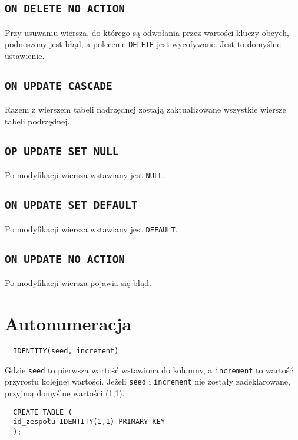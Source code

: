 \documentclass[a4paper]{article}
\begin{document}
\subsection{\tt ON DELETE NO ACTION}

Przy usuwaniu wiersza, do którego są odwołania przez wartości kluczy obcych, podnoszony jest błąd, a polecenie \texttt{DELETE} jest wycofywane. Jest to domyślne ustawienie.

\subsection{\tt ON UPDATE CASCADE}

Razem z wierszem tabeli nadrzędnej zostają zaktualizowane wszystkie wiersze tabeli podrzędnej.

\subsection{\tt OP UPDATE SET NULL}

Po modyfikacji wiersza wstawiany jest \texttt{NULL}.

\subsection{\tt ON UPDATE SET DEFAULT}

Po modyfikacji wiersza wstawiany jest \texttt{DEFAULT}.

\subsection{\tt ON UPDATE NO ACTION}

Po modyfikacji wiersza pojawia się błąd.

\section{Autonumeracja}

\begin{verbatim}
  IDENTITY(seed, increment)
\end{verbatim}

Gdzie {\tt seed} to pierwsza wartość wstawiona do kolumny, a {\tt increment} to wartość przyrostu kolejnej wartości.
Jeżeli {\tt seed} i {\tt increment} nie zostały zadeklarowane, przyjmą domyślne wartości (1,1).

\begin{verbatim}
  CREATE TABLE (
  id_zespołu IDENTITY(1,1) PRIMARY KEY
  );
\end{verbatim}
\end{document}
